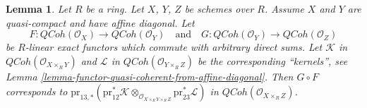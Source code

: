\documentclass[10pt,a4paper]{amsart}
\theoremstyle{plain}
\newtheorem{lemma}[subsection]{Lemma}
\theoremstyle{definition}
\theoremstyle{remark}
\numberwithin{equation}{subsection}
\def\QCoh{\mathit{QCoh}}
\begin{document}
\begin{lemma}
\label{lemma-compose-FM-QCoh}
Let $R$ be a ring. Let $X$, $Y$, $Z$ be schemes over $R$. Assume
$X$ and $Y$ are quasi-compact and have affine diagonal. Let
$$
F : \QCoh(\mathcal{O}_X) \to \QCoh(\mathcal{O}_Y)
\quad\text{and}\quad
G : \QCoh(\mathcal{O}_Y) \to \QCoh(\mathcal{O}_Z)
$$
be $R$-linear exact functors which commute with arbitrary direct sums.
Let $\mathcal{K}$ in $\QCoh(\mathcal{O}_{X \times_R Y})$
and $\mathcal{L}$ in $\QCoh(\mathcal{O}_{Y \times_R Z})$
be the corresponding ``kernels'', see
Lemma \ref{lemma-functor-quasi-coherent-from-affine-diagonal}.
Then $G \circ F$ corresponds to
$\text{pr}_{13, *}(\text{pr}_{12}^*\mathcal{K}
\otimes_{\mathcal{O}_{X \times_R Y \times_R Z}}
\text{pr}_{23}^*\mathcal{L})$ in $\QCoh(\mathcal{O}_{X \times_R Z})$.
\end{lemma}
\end{document}
